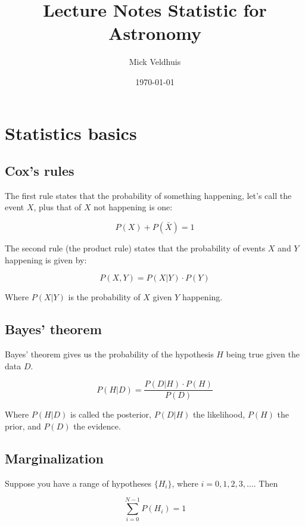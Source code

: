 \documentclass[a4paper]{article}
\title{Lecture Notes Statistic for Astronomy}
\author{Mick Veldhuis}
\date{\today}
\begin{document}
\maketitle

\tableofcontents

\section{Statistics basics}

\subsection{Cox's rules}

The first rule states that the probability of something happening, let's call the event $X$, plus that of $X$ not happening is one:

\begin{equation}
	P(X)+P(\bar{X})=1
\end{equation}

The second rule (the product rule) states that the probability of events $X$ and $Y$ happening is given by:

\begin{equation}
	P(X,Y)=P(X|Y)\cdot P(Y)
\end{equation}

Where $P(X|Y)$ is the probability of $X$ given $Y$ happening.

\subsection{Bayes' theorem}

Bayes' theorem gives us the probability of the hypothesis $H$ being true given the data $D$.

\begin{equation}
	P(H|D)=\frac{P(D|H)\cdot P(H)}{P(D)}
\end{equation}

Where $P(H|D)$ is called the posterior, $P(D|H)$ the likelihood, $P(H)$ the prior, and $P(D)$ the evidence. 

\subsection{Marginalization}

Suppose you have a range of hypotheses $\{H_i\}$, where $i=0,1,2,3,\dots$. Then

\begin{equation}
	\sum_{i=0}^{N-1} P(H_i)=1
\end{equation}
\end{document}
